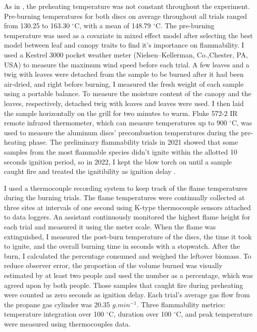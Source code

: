 \documentclass[12pt]{report}
\begin{document}
As in \citep{wyse2016quantitative}, the preheating temperature was not constant throughout the experiment. Pre-burning temperatures for both discs on average throughout all trials ranged from 130.25 to 163.30 $^{\circ}$C, with a mean of 148.79 $^{\circ}$C. The pre-burning temperature was used as a covariate in mixed effect model after selecting the best model between leaf and canopy traits to find it's importance on flammability. I used a Kestrel 3000 pocket weather meter (Nielsen–Kellerman, Co.,Chester, PA, USA) to measure the maximum wind speed before each trial. A few leaves and a twig with leaves were detached from the sample to be burned after it had been air-dried, and right before burning, I measured the fresh weight of each sample using a portable balance. To measure the moisture content of the canopy and the leaves, respectively, detached twig with leaves and leaves were used. I then laid the sample horizontally on the grill for two minutes to warm. Fluke 572-2 IR remote infrared thermometer, which can measure temperatures up to 900 $^{\circ}$C, was used to measure the aluminum discs' precombustion temperatures during the pre-heating phase. The preliminary flammability trials in 2021 showed that some samples from the most flammable species didn't ignite within the allotted 10 seconds ignition period, so in 2022, I kept the blow torch on until a sample caught fire and treated the ignitibility as ignition delay \citep{anderson1970forest}.

I used a thermocouple recording system to keep track of the flame temperatures during the burning trials. The flame temperatures were continually collected at three sites at intervals of one second using K-type thermocouple sensors attached to data loggers. An assistant continuously monitored the highest flame height for each trial and measured it using the meter scale. When the flame was extinguished, I measured the post-burn temperature of the discs, the time it took to ignite, and the overall burning time in seconds with a stopwatch. After the burn, I calculated the percentage consumed and weighed the leftover biomass. To reduce observer error, the proportion of the volume burned was visually estimated by at least two people 
and used the number as a percentage, which was agreed upon by both people. Those samples that caught fire during preheating were counted as zero seconds as ignition delay. Each trial's average gas flow from the propane gas cylinder was 20.35 ${g.min^{-1}}$. Three flammability metrics: temperature integration over 100 $^{\circ}$C, duration over 100 $^{\circ}$C, and peak temperature were measured using thermocouples data.
\end{document}
